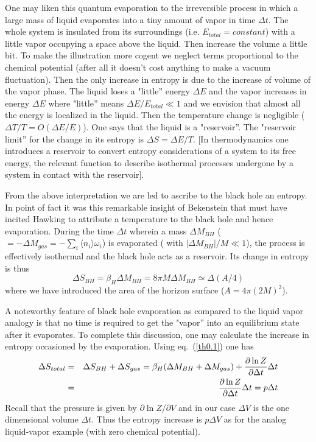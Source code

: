 \documentclass[12pt,oneside]{report}
\begin{document}
One may liken this quantum evaporation 
to the irreversible process in which a large
mass of liquid evaporates into a tiny amount of vapor in time $\Delta t$.
The whole system is insulated from its surroundings (i.e.
$E_{total}=constant$) with a little vapor occupying a  space above the
liquid. Then increase the volume a little bit. To make the illustration
more cogent
we neglect terms proportional to the chemical potential (after all
it doesn't cost anything to make a vacuum fluctuation).  Then the only increase
in entropy is due to the increase of volume of the vapor phase. The
liquid loses a "little'' energy $\Delta E$ and the vapor increases in
energy $\Delta E$ where "little'' means $\Delta E / E_{total} \ll1$ and we
envision that almost all the energy is localized in the liquid.
Then the temperature change is negligible
($\Delta T / T = O(\Delta E / E)$). One says that the liquid is a
"reservoir''. The "reservoir limit'' for the change in its entropy is
$\Delta S = \Delta E / T$. [In thermodynamics one introduces a reservoir
to convert entropy considerations of a system to its free energy, 
the relevant function to describe isothermal processes undergone by a system
in contact with the reservoir].
\par From the above interpretation we are led to ascribe to the black hole an
entropy. In point of fact it was this remarkable insight of Bekenstein \cite{beken} that must
 have incited Hawking to attribute a temperature to the black hole
and hence evaporation.
During the time $\Delta t$ wherein a mass $\Delta M_{BH}$ 
($= - \Delta M_{gas} =-\sum_i
\langle n_i \rangle \omega_i$) is evaporated ( with $| \Delta M_{BH} |
/ M \ll 1$),
the process is effectively isothermal and the black hole acts as a
reservoir. Its change in entropy is thus
\begin{equation}
\Delta S_{BH} = \beta_H \Delta M_{BH} = 8 \pi M \Delta M_{BH} \simeq \Delta
(A/4)
\label{th0.4}
\end{equation}
where we have introduced the area of the horizon surface ($A =4 \pi (2
M)^2$). 

A noteworthy feature of black hole evaporation as compared to the liquid
vapor analogy is that no time is required to get the 
"vapor'' into an equilibrium state after it evaporates.
To complete this discussion, one may
calculate the increase in entropy occasioned by the evaporation. Using
eq.~(\ref{th0.1}) one has
\begin{eqnarray}
\Delta S_{total} &=& \Delta S_{BH} + \Delta S_{gas} = \beta_H(\Delta
M_{BH} + \Delta M_{gas}) + {\partial \ln Z \over \partial \Delta
t}\Delta t\nonumber\\
&=& 
{\partial \ln Z \over \partial \Delta
t}\Delta t = p \Delta t
\label{th0.5}
\end{eqnarray}
Recall that the pressure is given
by $\partial \ln Z / \partial V$ and in our case $\Delta V$ is the one
dimensional volume $\Delta t$.
Thus the entropy increase is $p\Delta V$ as for the analog liquid-vapor
example (with zero chemical potential). 
\end{document}
